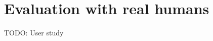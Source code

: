 \documentclass[english,a4paper,11pt,twoside]{StyleThese}
\begin{document}
\setcounter{chapter}{5} %
\dominitoc
\faketableofcontents
\fi

\chapter{Evaluation with real humans}
\minitoc

TODO: User study


\ifdefined{}
\else


\end{document}
